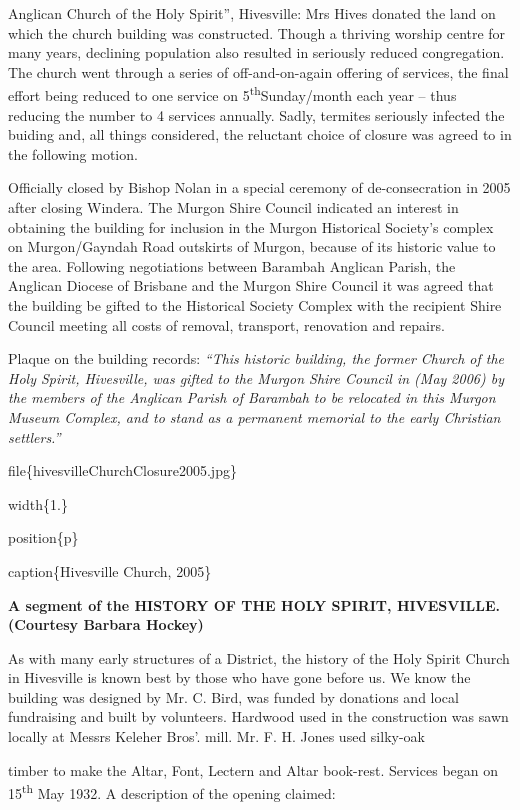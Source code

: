 Anglican Church of the Holy Spirit'', Hivesville: Mrs Hives donated the land on which the church building was constructed. Though a thriving worship centre for many years, declining population also resulted in seriously reduced congregation. The church went through a series of off-and-on-again offering of services, the final effort being reduced to one service on 5\textsuperscript{th}Sunday/month each year -- thus reducing the number to 4 services annually. Sadly, termites seriously infected the buiding and, all things considered, the reluctant choice of closure was agreed to in the following motion.

Officially closed by Bishop Nolan in a special ceremony of de-consecration in 2005 after closing Windera. The Murgon Shire Council indicated an interest in obtaining the building for inclusion in the Murgon Historical Society's complex on Murgon/Gayndah Road outskirts of Murgon, because of its historic value to the area. Following negotiations between Barambah Anglican Parish, the Anglican Diocese of Brisbane and the Murgon Shire Council it was agreed that the building be gifted to the Historical Society Complex with the recipient Shire Council meeting all costs of removal, transport, renovation and repairs.

Plaque on the building records: \emph{``This historic building, the former Church of the Holy Spirit, Hivesville, was gifted to the Murgon Shire Council in (May 2006) by the members of the Anglican Parish of Barambah to be relocated in this Murgon Museum Complex, and to stand as a permanent memorial to the early Christian settlers.''}

file\{hivesvilleChurchClosure2005.jpg\}

width\{1.\}

position\{p\}

caption\{Hivesville Church, 2005\}

\textbf{A segment of the HISTORY OF THE HOLY SPIRIT, HIVESVILLE. (Courtesy Barbara Hockey)}

As with many early structures of a District, the history of the Holy Spirit Church in Hivesville is known best by those who have gone before us. We know the building was designed by Mr. C. Bird, was funded by donations and local fundraising and built by volunteers. Hardwood used in the construction was sawn locally at Messrs Keleher Bros'. mill. Mr. F. H. Jones used silky-oak

timber to make the Altar, Font, Lectern and Altar book-rest. Services began on 15\textsuperscript{th} May 1932. A description of the opening claimed:

